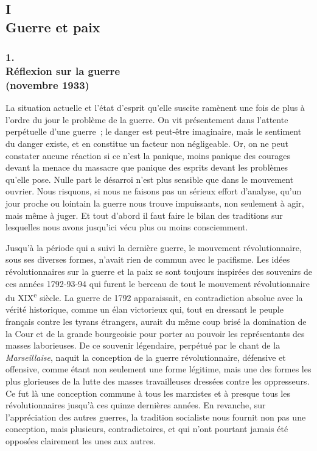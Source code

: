 \documentclass[french,twoside]{book} %
\begin{document}
\subsection[{I. Guerre et paix}]{I \\
Guerre et paix}
\subsubsection[{1. Réflexion sur la guerre, (novembre 1933)}]{1. \\
Réflexion sur la guerre \\
(novembre 1933)}
\noindent \par
La situation actuelle et l'état d'esprit qu'elle suscite ramènent une fois de plus à l'ordre du jour le problème de la guerre. On vit présentement dans l'attente perpétuelle d'une guerre ; le danger est peut-être imaginaire, mais le sentiment du danger existe, et en constitue un facteur non négligeable. Or, on ne peut constater aucune réaction si ce n'est la panique, moins panique des courages devant la menace du massacre que panique des esprits devant les problèmes qu'elle pose. Nulle part le désarroi n'est plus sensible que dans le mouvement ouvrier. Nous risquons, si nous ne faisons pas un sérieux effort d'analyse, qu'un jour proche ou lointain la guerre nous trouve impuissants, non seulement à agir, mais même à juger. Et tout d'abord il faut faire le bilan des traditions sur lesquelles nous avons jusqu'ici vécu plus ou moins con­sciemment.\par
Jusqu'à la période qui a suivi la dernière guerre, le mouvement révolution­naire, sous ses diverses formes, n'avait rien de commun avec le pacifisme. Les idées révolutionnaires sur la guerre et la paix se sont toujours inspirées des souvenirs de ces années 1792-93-94 qui furent le berceau de tout le mouvement révolutionnaire du XIX\textsuperscript{e} siècle. La guerre de 1792 apparaissait, en contradiction absolue avec la vérité historique, comme un élan victorieux qui, tout en dressant le peuple français contre les tyrans étrangers, aurait du même coup brisé la domination de la Cour et de la grande bourgeoisie pour porter au pouvoir les représentants des masses laborieuses. De ce souvenir légendaire, perpétué par le chant de la {\itshape Marseillaise}, naquit la conception de la guerre révolutionnaire, défensive et offensive, comme étant non seulement une forme légitime, mais une des formes les plus glorieuses de la lutte des masses tra­vailleuses dressées contre les oppresseurs. Ce fut là une conception commune à tous les marxistes et à presque tous les révolutionnaires jusqu'à ces quinze dernières années. En revanche, sur l'appréciation des autres guerres, la tradi­tion socialiste nous fournit non pas une conception, mais plusieurs, contra­dictoires, et qui n'ont pourtant jamais été opposées clairement les unes aux autres.\par
\end{document}
